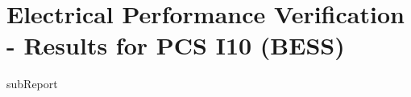\renewcommand{\DTRPcs}{I10PPM} %
\renewcommand{\DTRPcsLong}{I10 (BESS)}


    \section{Electrical Performance Verification - Results for PCS \DTRPcsLong}

    {{subReport}}
    \newpage


